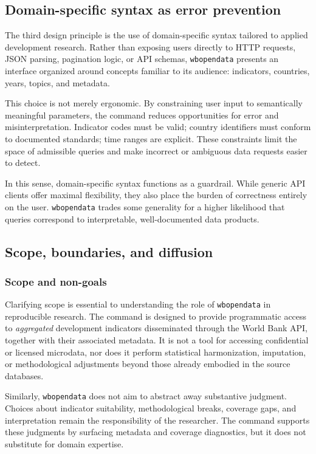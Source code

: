 \documentclass[bib]{statapress}
\begin{document}
\subsection{Domain-specific syntax as error prevention}
The third design principle is the use of domain-specific syntax tailored to applied
development research. Rather than exposing users directly to HTTP requests, JSON parsing,
pagination logic, or API schemas, \texttt{wbopendata} presents an interface organized around
concepts familiar to its audience: indicators, countries, years, topics, and metadata.

This choice is not merely ergonomic. By constraining user input to semantically meaningful
parameters, the command reduces opportunities for error and misinterpretation. Indicator
codes must be valid; country identifiers must conform to documented standards; time ranges
are explicit. These constraints limit the space of admissible queries and make incorrect
or ambiguous data requests easier to detect.

In this sense, domain-specific syntax functions as a guardrail. While generic API clients
offer maximal flexibility, they also place the burden of correctness entirely on the user.
\texttt{wbopendata} trades some generality for a higher likelihood that queries correspond
to interpretable, well-documented data products.

\subsection{Scope, boundaries, and diffusion}

\subsubsection*{Scope and non-goals}
Clarifying scope is essential to understanding the role of \texttt{wbopendata} in
reproducible research. The command is designed to provide programmatic access to
\emph{aggregated} development indicators disseminated through the World Bank API,
together with their associated metadata. It is not a tool for accessing confidential or
licensed microdata, nor does it perform statistical harmonization, imputation, or
methodological adjustments beyond those already embodied in the source databases.

Similarly, \texttt{wbopendata} does not aim to abstract away substantive judgment. Choices
about indicator suitability, methodological breaks, coverage gaps, and interpretation
remain the responsibility of the researcher. The command supports these judgments by
surfacing metadata and coverage diagnostics, but it does not substitute for domain
expertise.
\end{document}
